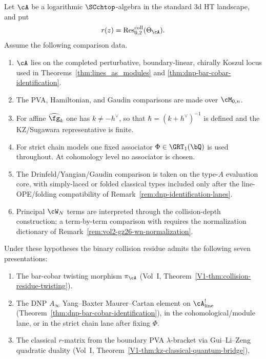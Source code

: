 \begin{theorem}
\label{thm:seven-face-master-3d-ht}
\label{thm:vol2-seven-faces-master}
Let $\cA$ be a logarithmic $\SCchtop$-algebra in the standard 3d HT
landscape, and put
\[
r(z)=\operatorname{Res}^{\mathrm{coll}}_{0,2}(\Theta_\cA).
\]
Assume the following comparison data.
\begin{enumerate}[label=\textup{(H\arabic*)},start=0]
\item $\cA$ lies on the completed perturbative, boundary-linear,
chirally Koszul locus used in Theorems~\ref{thm:lines_as_modules} and
\ref{thm:dnp-bar-cobar-identification}.
\item The PVA, Hamiltonian, and Gaudin comparisons are made over
$\cM_{0,n}$.
\item For affine $\widehat{\fg}_k$ one has $k\neq -h^\vee$, so that
$\hbar=(k+h^\vee)^{-1}$ is defined and the KZ/Sugawara representative
is finite.
\item For strict chain models one fixed associator
$\Phi\in \GRT_1(\bQ)$ is used throughout.  At cohomology level no
associator is chosen.
\item The Drinfeld/Yangian/Gaudin comparison is taken on the
type-$A$ evaluation core, with simply-laced or folded classical types
included only after the line-OPE/folding compatibility of
Remark~\ref{rem:dnp-identification-lanes}.
\item Principal $\cW_N$ terms are interpreted through the
collision-depth construction; a term-by-term comparison with
\cite{GZ26} requires the normalization dictionary of
Remark~\ref{rem:vol2-gz26-wn-normalization}.
\end{enumerate}
Under these hypotheses the binary collision residue admits the
following seven presentations:
\begin{enumerate}[label=\textup{(F\arabic*)}]
\item The bar-cobar twisting morphism $\pi_\cA$
 \textup{(}Vol~I, Theorem~\textup{\ref{V1-thm:collision-residue-twisting}}\textup{)}.
\item The DNP $A_\infty$ Yang--Baxter Maurer--Cartan element on
 $\cA^!_{\mathrm{line}}$
 \textup{(}Theorem~\textup{\ref{thm:dnp-bar-cobar-identification}}\textup{)},
 in the cohomological/module lane, or in the strict chain lane after
 fixing $\Phi$.
\item The classical $r$-matrix from the boundary PVA $\lambda$-bracket
 via Gui--Li--Zeng quadratic duality
 \textup{(}Vol~I, Theorem~\textup{\ref{V1-thm:kz-classical-quantum-bridge}}\textup{)},

\end{enumerate}
\end{theorem}
